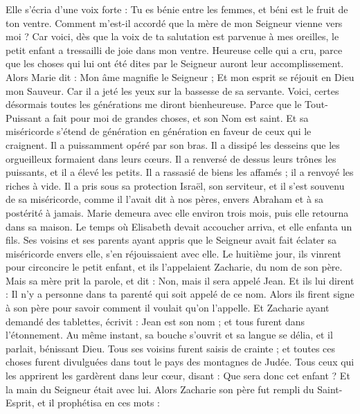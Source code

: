 \begin{multicols}{2}
Elle s'écria d’une voix forte : Tu es bénie entre les femmes, et béni est le fruit de ton ventre.
Comment m’est-il accordé que la mère de mon Seigneur vienne vers moi ?
Car voici, dès que la voix de ta salutation est parvenue à mes oreilles, le petit enfant a tressailli de joie dans mon ventre.
Heureuse celle qui a cru, parce que les choses qui lui ont été dites par le Seigneur auront leur accomplissement.
Alors Marie dit : Mon âme magnifie le Seigneur ;
Et mon esprit se réjouit en Dieu mon Sauveur.
Car il a jeté les yeux sur la bassesse de sa servante. Voici, certes désormais toutes les générations me diront bienheureuse.
Parce que le Tout-Puissant a fait pour moi de grandes choses, et son Nom est saint.
Et sa miséricorde s’étend de génération en génération en faveur de ceux qui le craignent.
Il a puissamment opéré par son bras. Il a dissipé les desseins que les orgueilleux formaient dans leurs cœurs.
Il a renversé de dessus leurs trônes les puissants, et il a élevé les petits.
Il a rassasié de biens les affamés ; il a renvoyé les riches à vide.
Il a pris sous sa protection Israël, son serviteur, et il s’est souvenu de sa miséricorde,
comme il l’avait dit à nos pères, envers Abraham et à sa postérité à jamais.
Marie demeura avec elle environ trois mois, puis elle retourna dans sa maison.
Le temps où Elisabeth devait accoucher arriva, et elle enfanta un fils.
Ses voisins et ses parents ayant appris que le Seigneur avait fait éclater sa miséricorde envers elle, s'en réjouissaient avec elle.
Le huitième jour, ils vinrent pour circoncire le petit enfant, et ils l'appelaient Zacharie, du nom de son père.
Mais sa mère prit la parole, et dit : Non, mais il sera appelé Jean.
Et ils lui dirent : Il n'y a personne dans ta parenté qui soit appelé de ce nom.
Alors ils firent signe à son père pour savoir comment il voulait qu’on l’appelle.
Et Zacharie ayant demandé des tablettes, écrivit : Jean est son nom ; et tous furent dans l’étonnement.
Au même instant, sa bouche s’ouvrit et sa langue se délia, et il parlait, bénissant Dieu.
Tous ses voisins furent saisis de crainte ; et toutes ces choses furent divulguées dans tout le pays des montagnes de Judée.
Tous ceux qui les apprirent les gardèrent dans leur cœur, disant : Que sera donc cet enfant ? Et la main du Seigneur était avec lui.
Alors Zacharie son père fut rempli du Saint-Esprit, et il prophétisa en ces mots :

\end{multicols}
